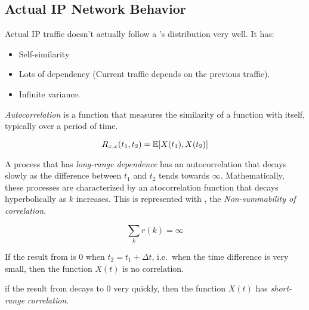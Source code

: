 \subsection{Actual IP Network Behavior}\label{subsec:Actual_IP_Behavior}
Actual IP traffic doesn't actually follow a 's distribution very well.
It has:
\begin{itemize}[noitemsep]
\item Self-similarity
\item Lots of dependency (Current traffic depends on the previous traffic).
\item Infinite variance.
\end{itemize}

\begin{definition}[Autocorrelation]\label{def:Autocorrelation}
  \emph{Autocorrelation} is a function that measures the similarity of a function with itself, typically over a period of time.

  \begin{equation}\label{eq:Autocorrelation}
    R_{x, x}(t_{1}, t_{2}) = \operatorname{\operatorname{\mathbb{E}}}[X(t_{1}), X(t_{2})]
  \end{equation}
\end{definition}

\begin{definition}\label{def:Long_Range_Dependence}
  A process that has \emph{long-range dependence} has an autocorrelation that decays slowly as the difference between $t_{1}$ and $t_{2}$ tends towards $\infty$.
  Mathematically, these processes are characterized by an atocorrelation function that decays hyperbolically as $k$ increases.
  This is represented with , the \emph{Non-summability of correlation}.

  \begin{equation}\label{eq:Non_Summability_Correlation}
    \sum\limits_{k} r(k) = \infty
  \end{equation}

  \begin{remark}[Uncorrelated]
    If the result from  is 0 when $t_{2} = t_{1} + \Delta t$, i.e.\ when the time difference is very small, then the function $X(t)$ is no correlation.
  \end{remark}

  \begin{remark}
    if the result from  decays to 0 very quickly, then the function $X(t)$ has \emph{short-range correlation}.
  \end{remark}
\end{definition}

